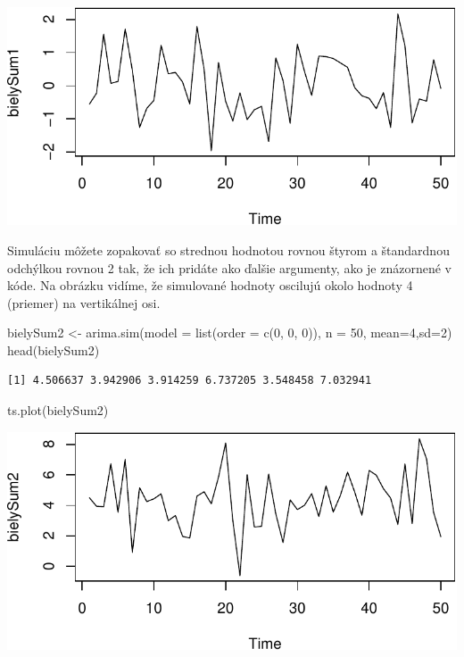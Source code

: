 \documentclass[
  letterpaper,
  DIV=11,
  numbers=noendperiod]{scrreprt}
\newenvironment{Shaded}{\begin{snugshade}}{\end{snugshade}}
\newcommand{\AttributeTok}[1]{\textcolor[rgb]{0.40,0.45,0.13}{#1}}
\newcommand{\DecValTok}[1]{\textcolor[rgb]{0.68,0.00,0.00}{#1}}
\newcommand{\FunctionTok}[1]{\textcolor[rgb]{0.28,0.35,0.67}{#1}}
\newcommand{\NormalTok}[1]{\textcolor[rgb]{0.00,0.23,0.31}{#1}}
\newcommand{\OtherTok}[1]{\textcolor[rgb]{0.00,0.23,0.31}{#1}}
\begin{document}
\includegraphics{prednaska3_NahodnaPrechadzkaStacionarita_files/figure-pdf/unnamed-chunk-2-1.pdf}

Simuláciu môžete zopakovať so strednou hodnotou rovnou štyrom a
štandardnou odchýlkou rovnou 2 tak, že ich pridáte ako ďalšie argumenty,
ako je znázornené v kóde. Na obrázku vidíme, že simulované hodnoty
oscilujú okolo hodnoty 4 (priemer) na vertikálnej osi.

\begin{Shaded}
\begin{Highlighting}[]
\NormalTok{bielySum2 }\OtherTok{\textless{}{-}} \FunctionTok{arima.sim}\NormalTok{(}\AttributeTok{model =} \FunctionTok{list}\NormalTok{(}\AttributeTok{order =} \FunctionTok{c}\NormalTok{(}\DecValTok{0}\NormalTok{, }\DecValTok{0}\NormalTok{, }\DecValTok{0}\NormalTok{)), }\AttributeTok{n =} \DecValTok{50}\NormalTok{, }\AttributeTok{mean=}\DecValTok{4}\NormalTok{,}\AttributeTok{sd=}\DecValTok{2}\NormalTok{)}
\FunctionTok{head}\NormalTok{(bielySum2)}
\end{Highlighting}
\end{Shaded}

\begin{verbatim}
[1] 4.506637 3.942906 3.914259 6.737205 3.548458 7.032941
\end{verbatim}

\begin{Shaded}
\begin{Highlighting}[]
\FunctionTok{ts.plot}\NormalTok{(bielySum2)}
\end{Highlighting}
\end{Shaded}

\includegraphics{prednaska3_NahodnaPrechadzkaStacionarita_files/figure-pdf/unnamed-chunk-3-1.pdf}
\end{document}

